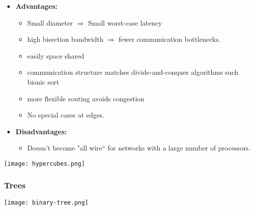 \documentclass[../main.tex]{subfiles}
\begin{document}
\begin{multicols}{2}
	\begin{itemize}
		\item \textbf{Advantages:}
		      \begin{itemize}
			      \item Small diameter \(\Rightarrow\) Small worst-case latency
			      \item high bisection bandwidth \(\Rightarrow\) fewer communication bottlenecks.
			      \item easily space shared
			      \item communication structure matches divide-and-conquer algorithms such bionic sort
			      \item more flexible routing avoids congestion
			      \item No special cases at edges.
		      \end{itemize}
		\item \textbf{Disadvantages:}
		      \begin{itemize}
			      \item Doesn't become "all wire“ for networks with a large number of processors.
		      \end{itemize}
	\end{itemize}

	\begin{center}
		\texttt{[image: hypercubes.png]}
	\end{center}
\end{multicols}

\subsubsection{Trees}

\begin{center}
	\texttt{[image: binary-tree.png]}
\end{center}
\end{document}
